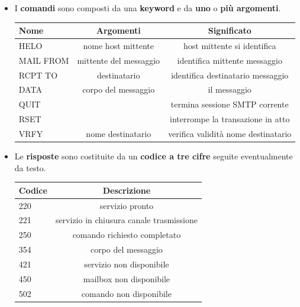 \documentclass[11pt,a4paper,oneside]{book}
\theoremstyle{definition}
\begin{document}
\begin{itemize}
	\item I \textbf{comandi} sono composti da una \textbf{keyword} e da \textbf{uno} o \textbf{più argomenti}.
	      \begin{table}[h!]
		      \begin{center}
			      \label{tab:table1}
			      \begin{tabular}{l|c|c}
				      \textbf{Nome} & \textbf{Argomenti}     & \textbf{Significato}                \\
				      \hline
				      HELO          & nome host mittente     & host mittente si identifica         \\
				      MAIL FROM     & mittente del messaggio & identifica mittente  messaggio      \\
				      RCPT TO       & destinatario           & identifica destinatario messaggio   \\
				      DATA          & corpo del messaggio    & il messaggio                        \\
				      QUIT          &                        & termina sessione SMTP
				      corrente                                                                     \\
				      RSET          &                        & interrompe la transazione in atto   \\
				      VRFY          & nome destinatario      & verifica validità nome destinatario \\
			      \end{tabular}
		      \end{center}
	      \end{table}
	\item Le \textbf{risposte} sono costituite da un \textbf{codice a tre cifre} seguite eventualmente da testo.
	      \begin{table}[h!]
		      \begin{center}
			      \label{tab:table1}
			      \begin{tabular}{l|c}
				      \textbf{Codice} & \textbf{Descrizione}                     \\
				      \hline
				      220             & servizio pronto                          \\
				      221             & servizio in chiusura canale trasmissione \\
				      250             & comando richiesto completato             \\
				      354             & corpo del messaggio                      \\
				      421             & servizio non disponibile                 \\
				      450             & mailbox non disponibile                  \\
				      502             & comando non disponibile                  \\
			      \end{tabular}
		      \end{center}
	      \end{table}
\end{itemize}
\end{document}
